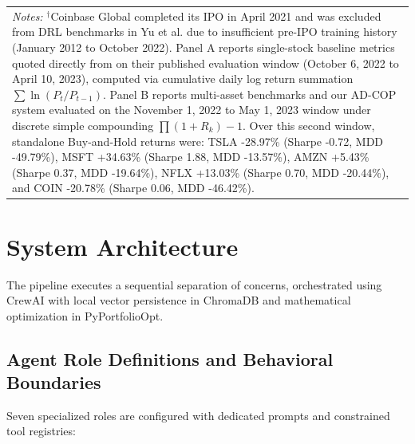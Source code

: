 \documentclass[conference]{IEEEtran}
\begin{document}
\begin{table}[t]
\begin{tabular}{llcccc}
\multicolumn{6}{p{0.95\textwidth}}{\footnotesize \textit{Notes:} $^\dagger$Coinbase Global completed its IPO in April 2021 and was excluded from DRL benchmarks in Yu et al. \cite{yu2023finmem} due to insufficient pre-IPO training history (January 2012 to October 2022). Panel A reports single-stock baseline metrics quoted directly from \cite{yu2023finmem} on their published evaluation window (October 6, 2022 to April 10, 2023), computed via cumulative daily log return summation $\sum \ln(P_t/P_{t-1})$. Panel B reports multi-asset benchmarks and our AD-COP system evaluated on the November 1, 2022 to May 1, 2023 window under discrete simple compounding $\prod (1 + R_k) - 1$. Over this second window, standalone Buy-and-Hold returns were: TSLA -28.97\% (Sharpe -0.72, MDD -49.79\%), MSFT +34.63\% (Sharpe 1.88, MDD -13.57\%), AMZN +5.43\% (Sharpe 0.37, MDD -19.64\%), NFLX +13.03\% (Sharpe 0.70, MDD -20.44\%), and COIN -20.78\% (Sharpe 0.06, MDD -46.42\%).}
\end{tabular}
\end{table}

\section{System Architecture}

The pipeline executes a sequential separation of concerns, orchestrated using CrewAI with local vector persistence in ChromaDB and mathematical optimization in PyPortfolioOpt.

\subsection{Agent Role Definitions and Behavioral Boundaries}

Seven specialized roles are configured with dedicated prompts and constrained tool registries:
\end{document}
